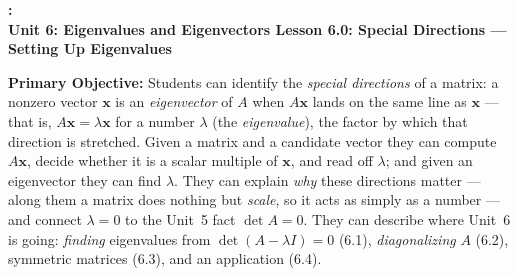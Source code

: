 \documentclass[10pt]{article}
\newcommand{\xx}{\mathbf{x}}
\newcommand{\UnitNumberName}{Unit 6: Eigenvalues and Eigenvectors \quad}
\newcommand{\LessonNumberName}{Lesson 6.0: Special Directions --- Setting Up Eigenvalues}
\begin{document}
\begin{center}
    {\Large\bfseries \CourseName: \SchoolYear \\
    {\small\bfseries \UnitNumberName \LessonNumberName}}
\end{center}

\begin{tcolorbox}[colback=blush, colframe=burgundy, boxrule=0.9pt, arc=2mm,
    left=2mm, right=2mm, top=1.5mm, bottom=1.5mm]
    \textbf{Primary Objective:} Students can identify the \emph{special directions} of a matrix:
    a nonzero vector $\xx$ is an \emph{eigenvector} of $A$ when $A\xx$ lands on the same line as
    $\xx$ --- that is, $A\xx=\lambda\xx$ for a number $\lambda$ (the \emph{eigenvalue}), the factor
    by which that direction is stretched. Given a matrix and a candidate vector they can compute
    $A\xx$, decide whether it is a scalar multiple of $\xx$, and read off $\lambda$; and given an
    eigenvector they can find $\lambda$. They can explain \emph{why} these directions matter --- along
    them a matrix does nothing but \emph{scale}, so it acts as simply as a number --- and connect
    $\lambda=0$ to the Unit~5 fact $\det A=0$. They can describe where Unit~6 is going: \emph{finding}
    eigenvalues from $\det(A-\lambda I)=0$ (6.1), \emph{diagonalizing} $A$ (6.2), symmetric matrices
    (6.3), and an application (6.4).
\end{tcolorbox}
\end{document}
